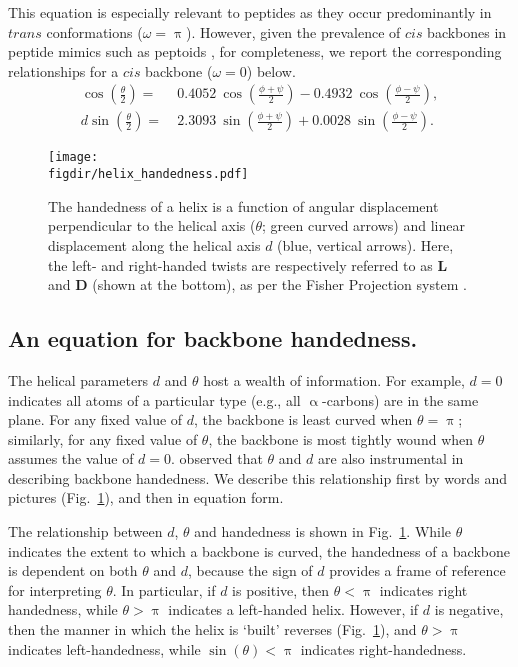 \documentclass[fleqn,10pt]{wlpeerj} %
\newcommand{\Fig}[1]{Fig.~\ref{#1}}
\newcommand{\figdir}{./figures}
\begin{document}
This equation is especially relevant to peptides as they occur predominantly in $trans$ conformations ($\omega=\uppi$). However, given the prevalence of $cis$ backbones in peptide mimics such as peptoids \citep{Mirijanian2014,Gorske2016}, for completeness, we report the corresponding relationships for a $cis$ backbone ($\omega=0$) below.
\begin{align}
\label{eqn:theta_cis}
\cos\left(\frac{\theta}{2}\right) =&~0.4052~\cos\left(\frac{\phi+\psi}{2}\right)
                                    -0.4932~\cos\left(\frac{\phi-\psi}{2}\right), \\
\label{eqn:theta_d}
d \sin\left(\frac{\theta}{2}\right) = &~2.3093~\sin\left(\frac{\phi+\psi}{2}\right)
                                       +0.0028~\sin\left(\frac{\phi-\psi}{2}\right).
\end{align}

\begin{figure}[t!]
\centering
\texttt{[image: \\figdir/helix\_handedness.pdf]}
\caption{\label{fig:helix_handedness} The handedness of a helix is a function of angular displacement perpendicular to the helical axis ($\theta$; green curved arrows) and linear displacement along the helical axis $d$ (blue, vertical arrows). Here, the left- and right-handed twists are respectively referred to as $\textbf{L}$ and $\textbf{D}$ (shown at the bottom), as per the Fisher Projection system \citep{Cross2013}.}
\end{figure}

\subsection*{An equation for backbone handedness.} 
The helical parameters $d$ and $\theta$ host a wealth of information. For example, $d=0$ indicates all atoms of a particular type (e.g., all $\upalpha$-carbons) are in the same plane. For any fixed value of $d$, the backbone is least curved when $\theta=\uppi$; similarly, for any fixed value of $\theta$, the backbone is most tightly wound when $\theta$ assumes the value of $d=0$. \cite{Zacharias2013} observed that $\theta$ and $d$ are also instrumental in describing backbone handedness. We describe this relationship first by words and pictures (\Fig{fig:helix_handedness}), and then in equation form.

The relationship between $d$, $\theta$ and  handedness is shown in \Fig{fig:helix_handedness}. While $\theta$ indicates the extent to which a backbone is curved, the handedness of a backbone is dependent on both $\theta$ and $d$, because the sign of $d$ provides a frame of reference for interpreting $\theta$. In particular, if $d$ is positive, then $\theta < \uppi$ indicates right handedness, while $\theta > \uppi$ indicates a left-handed helix. However, if $d$ is negative, then the manner in which the helix is `built' reverses (\Fig{fig:helix_handedness}), and $\theta>\uppi$ indicates left-handedness, while $\sin(\theta)<\uppi$ indicates right-handedness.
\end{document}
